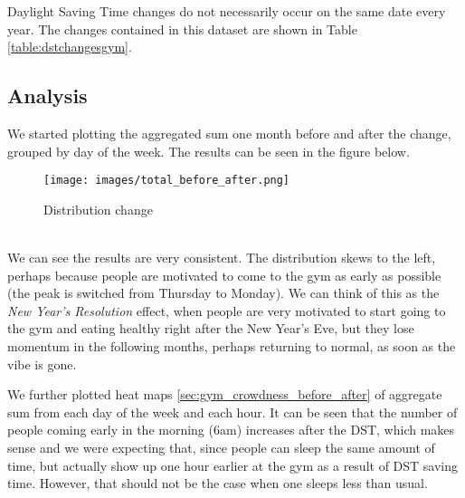 \documentclass[11pt]{article}
\begin{document}
Daylight Saving Time changes do not necessarily occur on the same date every year. The changes contained in this dataset are shown in Table \ref{table:dstchangesgym}.

\begin{table}[h!]
\caption{DST changes in Gym Crowdness dataset}\label{table:dstchangesgym}
\end{table}

\subsection{Analysis}
We started plotting the aggregated sum one month before and after the change, grouped by day of the week. The results can be seen in the figure below. 
\begin{figure}[h!]
\label{gym_total_before_after}
\centering
\texttt{[image: images/total\_before\_after.png]}
\caption{Distribution change}
\end{figure}\\
We can see the results are very consistent. The distribution skews to the left, perhaps because people are motivated to come to the gym as early as possible (the peak is switched from Thursday to Monday). We can think of this as the \textit{New Year's Resolution} effect, when people are very motivated to start going to the gym and eating healthy right after the New Year's Eve, but they lose momentum in the following months, perhaps returning to normal, as soon as the vibe is gone.

We further plotted heat maps \ref{sec:gym_crowdness_before_after} of aggregate sum from each day of the week and each hour. It can be seen that the number of people coming early in the morning (6am) increases after the DST, which makes sense and we were expecting that, since people can sleep the same amount of time, but actually show up one hour earlier at the gym as a result of DST saving time. However, that should not be the case when one sleeps less than usual.
\end{document}
